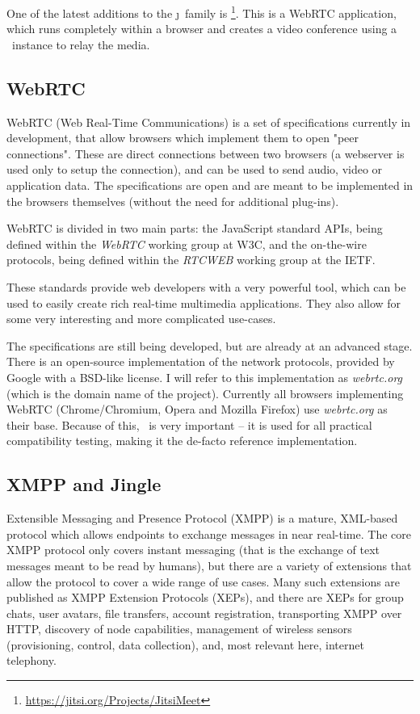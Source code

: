\documentclass[twoside,openright,a4paper,12pt,english]{article}
\begin{document}
One of the latest additions to the \j\ family is
\jm\footnote{\url{https://jitsi.org/Projects/JitsiMeet}}. This is a WebRTC
application, which runs completely within a browser and creates a video
conference using a \jvb\ instance to relay the media.




\subsection{WebRTC}
WebRTC (Web Real-Time Communications) is a set of specifications 
currently in development, that allow browsers which implement them to open
"peer connections". These are direct connections between two
browsers (a webserver is used only to setup the connection), and can be used to
send audio, video or application data. The specifications are open and are meant
to be implemented in the browsers themselves (without the need for additional
plug-ins).

WebRTC is divided in two main parts: the JavaScript standard APIs, being defined within
the \emph{WebRTC} working group\cite{webrtc-wg} at W3C,
and the on-the-wire protocols, being defined within
the \emph{RTCWEB} working group\cite{rtcweb-wg} at the IETF.

These standards provide web developers with a very powerful tool, which
can be used to easily create rich real-time multimedia applications. They
also allow for some very interesting and more complicated use-cases.

The specifications are still being developed, but are already at an advanced stage. There is
an open-source implementation of the network protocols, provided by Google with
a BSD-like license. I will refer to this implementation as \emph{webrtc.org}
(which is the domain name of the project). Currently all browsers implementing
WebRTC (Chrome/Chromium, Opera and Mozilla Firefox) 
use \emph{webrtc.org} as their base. Because of this, \wrtc\ is very important -- it is
used for all practical compatibility testing, making it the de-facto reference implementation.




\subsection{XMPP and Jingle}
Extensible Messaging and Presence Protocol (XMPP)\cite{rfc6120} is a mature,
XML-based protocol which allows endpoints
to exchange messages in near real-time. The core XMPP protocol only covers instant messaging (that is the exchange of
text messages meant to be read by humans), but there are a variety of extensions that allow the protocol
to cover a wide range of use cases. Many such extensions are published as XMPP Extension Protocols (XEPs), and there are XEPs for
group chats, user avatars, file transfers, account registration, transporting
XMPP over HTTP, discovery of node capabilities, management of  wireless sensors (provisioning, control, data collection),
and, most relevant here, internet telephony.
\end{document}
